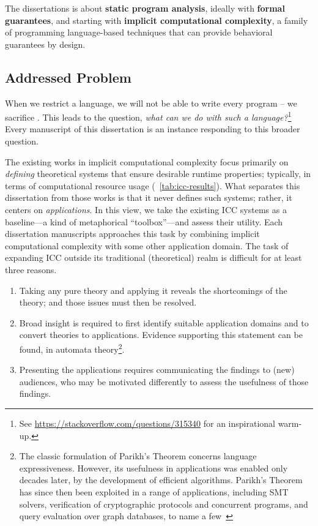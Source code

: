 \begin{mdframed}[backgroundcolor=conceptbase,linecolor=concept,nobreak=true]
The dissertations is about \textbf{static program analysis}, ideally with
\textbf{formal guarantees}, and starting with \textbf{implicit computational
complexity}, a family of programming language-based techniques that can provide
behavioral guarantees by design.
\end{mdframed}

\subsection{Addressed Problem}
\label{subsec:problem}

When we restrict a language, we will not be able to write every program -- \ie we sacrifice .
This leads to the question, \emph{what can we do with such a language?}\footnote{
See \url{https://stackoverflow.com/questions/315340} for an inspirational warm-up.}
Every manuscript of this dissertation is an instance responding to this broader question.

The existing works in implicit computational complexity focus primarily on \emph{defining} theoretical systems that ensure desirable runtime properties;
typically, in terms of computational resource usage (\cf~\autoref{tab:icc-results}).
What separates this dissertation from those works is that it never defines such systems;
rather, it centers on \emph{applications}.
In this view, we take the existing ICC systems as a baseline---a kind of metaphorical \enquote{toolbox}---and assess their utility.
Each dissertation manuscripts approaches this task by combining implicit computational complexity with some other application domain.
The task of expanding ICC outside its traditional (theoretical) realm is difficult for at least three reasons.

\begin{enumerate}

\item Taking any pure theory and applying it reveals the shortcomings of the theory;
      and those issues must then be resolved.

\item Broad insight is required to first identify suitable application domains and to convert theories to applications.
Evidence supporting this statement can be found, \eg in automata theory\footnote{
The classic formulation of Parikh's Theorem concerns language expressiveness.
However, its usefulness in applications was enabled {only decades later}, by the development of efficient algorithms.
Parikh's Theorem has since then been exploited in a range of applications, including SMT solvers, verification of cryptographic protocols and concurrent programs, and query evaluation over graph databases, to name a few~\cite[pg. 2]{hague2024}}.

\item Presenting the applications requires communicating the findings to (new) audiences, who may be motivated differently to assess the {usefulness} of those findings.
\end{enumerate}

